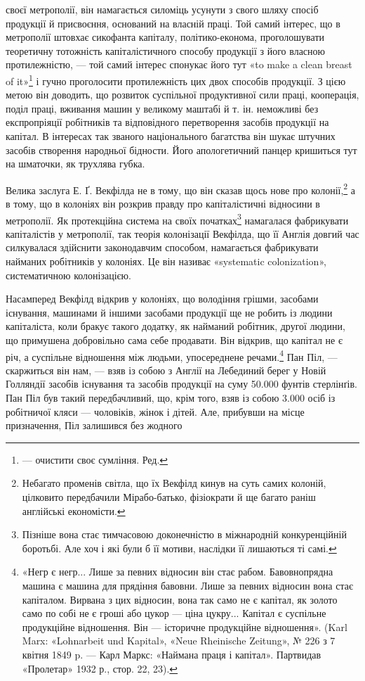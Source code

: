 своєї метрополії, він намагається силоміць усунути з свого шляху спосіб продукції й присвоєння,
оснований на власній праці. Той самий інтерес, що в метрополії штовхає сикофанта капіталу,
політико-економа, проголошувати теоретичну тотожність капіталістичного способу продукції з його
власною протилежністю, — той самий інтерес спонукає його тут «to make a clean breast of it»\footnote*{
— очистити своє сумління. Ред.
} і гучно
проголосити протилежність цих двох способів продукції. З цією метою він доводить, що розвиток
суспільної продуктивної сили праці, кооперація, поділ праці, вживання машин у великому маштабі й т.
ін. неможливі без експропріяції робітників та відповідного перетворення засобів продукції на
капітал. В інтересах так званого національного багатства він шукає штучних засобів створення
народньої бідности. Його апологетичний панцер кришиться тут на шматочки, як трухлява губка.

Велика заслуга Е. Ґ. Векфілда не в тому, що він сказав щось нове про колонії,\footnote{
Небагато променів світла, що їх Векфілд кинув на суть самих колоній, цілковито передбачили
Мірабо-батько, фізіократи й ще багато раніш англійські економісти.
} а в тому, що в
колоніях він розкрив правду про капіталістичні відносини в метрополії. Як протекційна система на
своїх початках\footnote{
Пізніше вона стає тимчасовою доконечністю в міжнародній конкуренційній боротьбі. Але хоч і які
були б її мотиви, наслідки її лишаються ті самі.
} намагалася фабрикувати капіталістів
у метрополії, так теорія колонізації Векфілда, що її Англія довгий час силкувалася здійснити
законодавчим способом, намагається фабрикувати найманих робітників у колоніях. Це він називає
«systematic colonization», систематичною колонізацією.

Насамперед Векфілд відкрив у колоніях, що володіння грішми, засобами існування, машинами й іншими
засобами продукції ще не робить із людини капіталіста, коли бракує такого додатку, як найманий
робітник, другої людини, що примушена добровільно сама себе продавати. Він відкрив, що капітал не є
річ, а суспільне відношення між людьми, упосереднене речами.\footnote{
«Негр є негр... Лише за певних відносин він стає рабом. Бавовнопрядна машина є машина для
прядіння бавовни. Лише за певних відносин вона стає капіталом. Вирвана з цих відносин, вона так само
не є капітал, як золото само по собі не є гроші або цукор — ціна цукру... Капітал є суспільне
продукційне відношення. Він — історичне продукційне відношення». (Karl Marx: «Lohnarbeit und
Kapital», «Neue Rheinische Zeitung», № 226 з 7 квітня 1849 p. — Карл Маркс: «Наймана праця і
капітал». Партвидав «Пролетар» 1932 р., стор. 22, 23).
} Пан Піл, — скаржиться він нам, —
взяв із собою з Англії на Лебединий берег у Новій Голляндії засобів існування та засобів продукції
на суму 50.000 фунтів стерлінґів. Пан Піл був такий передбачливий, що, крім того, взяв із собою
3.000 осіб із робітничої кляси — чоловіків, жінок і дітей. Але, прибувши на місце призначення, Піл
залишився без жодного